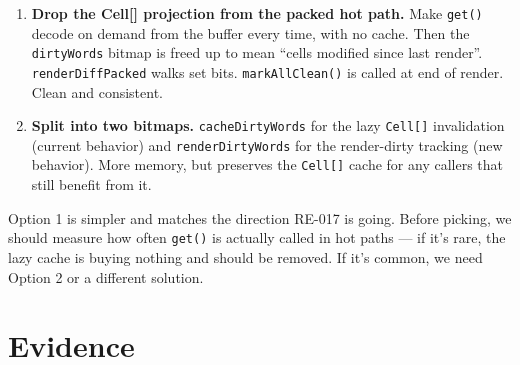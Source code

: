 \begin{enumerate}
\def\labelenumi{\arabic{enumi}.}
\item
  \textbf{Drop the Cell{[}{]} projection from the packed hot path.} Make \texttt{g\allowbreak{}e\allowbreak{}t\allowbreak{}(\allowbreak{})} decode on demand from the buffer every time, with no cache. Then the \texttt{d\allowbreak{}i\allowbreak{}r\allowbreak{}t\allowbreak{}y\allowbreak{}W\allowbreak{}o\allowbreak{}r\allowbreak{}d\allowbreak{}s} bitmap is freed up to mean ``cells modified since last render''. \texttt{r\allowbreak{}e\allowbreak{}n\allowbreak{}d\allowbreak{}e\allowbreak{}r\allowbreak{}D\allowbreak{}i\allowbreak{}f\allowbreak{}f\allowbreak{}P\allowbreak{}a\allowbreak{}c\allowbreak{}k\allowbreak{}e\allowbreak{}d} walks set bits. \texttt{m\allowbreak{}a\allowbreak{}r\allowbreak{}k\allowbreak{}A\allowbreak{}l\allowbreak{}l\allowbreak{}C\allowbreak{}l\allowbreak{}e\allowbreak{}a\allowbreak{}n\allowbreak{}(\allowbreak{})} is called at end of render. Clean and consistent.
\item
  \textbf{Split into two bitmaps.} \texttt{c\allowbreak{}a\allowbreak{}c\allowbreak{}h\allowbreak{}e\allowbreak{}D\allowbreak{}i\allowbreak{}r\allowbreak{}t\allowbreak{}y\allowbreak{}W\allowbreak{}o\allowbreak{}r\allowbreak{}d\allowbreak{}s} for the lazy \texttt{C\allowbreak{}e\allowbreak{}l\allowbreak{}l\allowbreak{}[\allowbreak{}]} invalidation (current behavior) and \texttt{r\allowbreak{}e\allowbreak{}n\allowbreak{}d\allowbreak{}e\allowbreak{}r\allowbreak{}D\allowbreak{}i\allowbreak{}r\allowbreak{}t\allowbreak{}y\allowbreak{}W\allowbreak{}o\allowbreak{}r\allowbreak{}d\allowbreak{}s} for the render-dirty tracking (new behavior). More memory, but preserves the \texttt{C\allowbreak{}e\allowbreak{}l\allowbreak{}l\allowbreak{}[\allowbreak{}]} cache for any callers that still benefit from it.
\end{enumerate}

Option 1 is simpler and matches the direction RE-017 is going. Before picking, we should measure how often \texttt{g\allowbreak{}e\allowbreak{}t\allowbreak{}(\allowbreak{})} is actually called in hot paths --- if it's rare, the lazy cache is buying nothing and should be removed. If it's common, we need Option 2 or a different solution.

\section{Evidence}\label{record-368-evidence}

